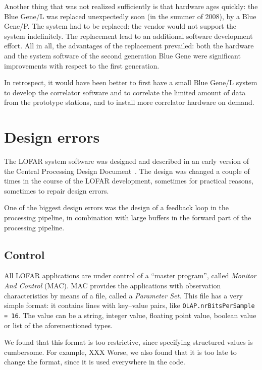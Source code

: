 \documentclass[article]{sig-alternate}
\begin{document}
Another thing that was not realized sufficiently is that hardware ages quickly:
the Blue Gene/L was replaced unexpectedly soon (in the summer of 2008),
by a Blue Gene/P.
The system had to be replaced: the vendor would not support the system
indefinitely.
The replacement lead to an additional software development effort.
All in all, the advantages of the replacement prevailed: both the hardware and
the system software of the second generation Blue Gene were significant
improvements with respect to the first generation.

In retrospect, it would have been better to first have a small Blue Gene/L
system to develop the correlator software and to correlate the limited
amount of data from the prototype stations, and to install more correlator
hardware on demand.


\section{Design errors}

The LOFAR system software was designed and described in an early version
of the Central Processing Design Document~\cite{X}.
The design was changed a couple of times in the course of the LOFAR development,
sometimes for practical reasons, sometimes to repair design errors.

One of the biggest design errors was the design of a feedback loop in the
processing pipeline, in combination with large buffers in the forward part
of the processing pipeline.







\subsection{Control}

All LOFAR applications are under control of a ``master program'', called
\emph{Monitor And Control\/} (MAC).
MAC provides the applications with observation characteristics by means of
a file, called a \emph{Parameter Set}.
This file has a very simple format: it contains lines with key--value pairs,
like \texttt{OLAP.nrBitsPerSample = 16}.
The value can be a string, integer value, floating point value, boolean
value or list of the aforementioned types.

We found that this format is too restrictive, since specifying structured
values is cumbersome.
For example, XXX
Worse, we also found that it is too late to change the format, since it
is used everywhere in the code.
\end{document}
